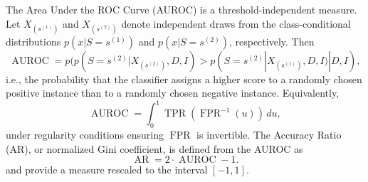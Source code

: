 \begin{example}
\begin{equation}
	\end{equation}
	The Area Under the ROC Curve (AUROC) is a threshold-independent measure. Let $X_{(s^{(1)})}$ and $X_{(s^{(2)})}$ denote independent draws from the class-conditional distributions $p(x | S = s^{(1)})$ and $p(x | S = s^{(2)})$, respectively. Then
	\begin{equation}
		\operatorname{AUROC} = p( p(S=s^{(2)} | X_{(s^{(2)})}, D, I) > p(S=s^{(2)} | X_{(s^{(1)})}, D, I)| D, I ),
	\end{equation}
	i.e., the probability that the classifier assigns a higher score to a randomly chosen positive instance than to a randomly chosen negative instance. Equivalently,
	\begin{equation}
		\operatorname{AUROC} = \int_0^1 \operatorname{TPR}(\operatorname{FPR}^{-1}(u)) \, du,
	\end{equation}
	under regularity conditions ensuring $\operatorname{FPR}$ is invertible. The Accuracy Ratio (AR), or normalized Gini coefficient, is defined from the AUROC as
	\begin{equation}
		\operatorname{AR} = 2 \cdot \operatorname{AUROC} - 1.
	\end{equation}
	and provide a measure rescaled to the interval $[-1,1]$.
	
\end{example}


